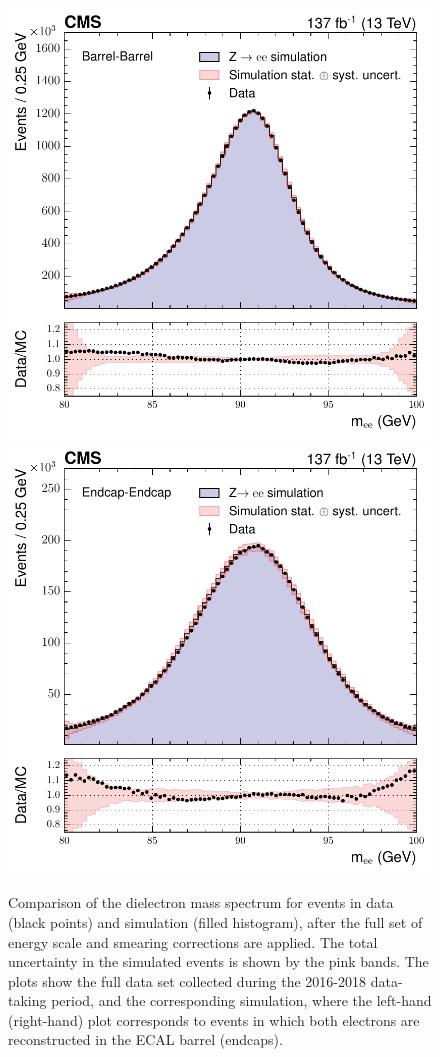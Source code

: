 \begin{figure}
  \centering
  \includegraphics[width=.49\textwidth]{Figures/hgg_overview/money_run2_EbEb_inclusive.pdf}
  \includegraphics[width=.49\textwidth]{Figures/hgg_overview/money_run2_EeEe_inclusive.pdf}
  \caption[Dielectron mass spectrum for \Zee events in data and simulation after the energy corrections are applied]
  {
    Comparison of the dielectron mass spectrum for \Zee events in data (black points) and simulation (filled histogram), after the full set of energy scale and smearing corrections are applied. The total uncertainty in the simulated events is shown by the pink bands. The plots show the full data set collected during the 2016-2018 data-taking period, and the corresponding simulation, where the left-hand (right-hand) plot corresponds to events in which both electrons are reconstructed in the ECAL barrel (endcaps).
  }
  \label{fig:photon_energy_0}
\end{figure}

